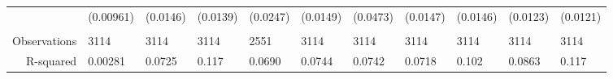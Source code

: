 \begin{tabular}{rrrrrrrrrrr}
      & \multicolumn{1}{l}{(0.00961)} & \multicolumn{1}{l}{(0.0146)} & \multicolumn{1}{l}{(0.0139)} & \multicolumn{1}{l}{(0.0247)} & \multicolumn{1}{l}{(0.0149)} & \multicolumn{1}{l}{(0.0473)} & \multicolumn{1}{l}{(0.0147)} & \multicolumn{1}{l}{(0.0146)} & \multicolumn{1}{l}{(0.0123)} & \multicolumn{1}{l}{(0.0121)} \\
      & \multicolumn{1}{l}{} & \multicolumn{1}{l}{} & \multicolumn{1}{l}{} & \multicolumn{1}{l}{} & \multicolumn{1}{l}{} & \multicolumn{1}{l}{} & \multicolumn{1}{l}{} & \multicolumn{1}{l}{} & \multicolumn{1}{l}{} & \multicolumn{1}{l}{} \\
Observations & \multicolumn{1}{l}{3114} & \multicolumn{1}{l}{3114} & \multicolumn{1}{l}{3114} & \multicolumn{1}{l}{2551} & \multicolumn{1}{l}{3114} & \multicolumn{1}{l}{3114} & \multicolumn{1}{l}{3114} & \multicolumn{1}{l}{3114} & \multicolumn{1}{l}{3114} & \multicolumn{1}{l}{3114} \\
R-squared & \multicolumn{1}{l}{0.00281} & \multicolumn{1}{l}{0.0725} & \multicolumn{1}{l}{0.117} & \multicolumn{1}{l}{0.0690} & \multicolumn{1}{l}{0.0744} & \multicolumn{1}{l}{0.0742} & \multicolumn{1}{l}{0.0718} & \multicolumn{1}{l}{0.102} & \multicolumn{1}{l}{0.0863} & \multicolumn{1}{l}{0.117} \\
\bottomrule
\end{tabular}%

